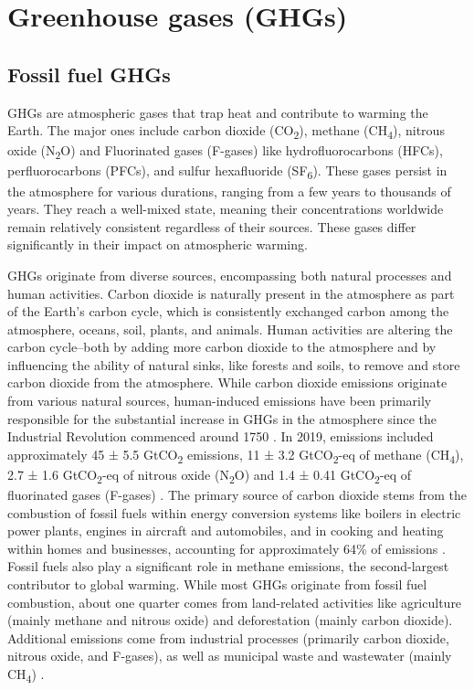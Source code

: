 \section{Greenhouse gases (GHGs)}
\subsection{Fossil fuel GHGs}

GHGs are atmospheric gases that trap heat and contribute to warming the Earth. The major ones include carbon dioxide (CO\textsubscript{2}), methane (CH\textsubscript{4}), nitrous oxide (N\textsubscript{2}O) and Fluorinated gases (F-gases) like hydrofluorocarbons (HFCs), perfluorocarbons (PFCs), and sulfur hexafluoride (SF\textsubscript{6}). These gases persist in the atmosphere for various durations, ranging from a few years to thousands of years. They reach a well-mixed state, meaning their concentrations worldwide remain relatively consistent regardless of their sources. 
These gases differ significantly in their impact on atmospheric warming. \par
GHGs originate from diverse sources, encompassing both natural processes and human activities. Carbon dioxide is naturally present in the atmosphere as part of the Earth's carbon cycle, which is consistently exchanged carbon among the atmosphere, oceans, soil, plants, and animals. Human activities are altering the carbon cycle–both by adding more carbon dioxide to the atmosphere and by influencing the ability of natural sinks, like forests and soils, to remove and store carbon dioxide from the atmosphere. While carbon dioxide emissions originate from various natural sources, human-induced emissions have been primarily responsible for the substantial increase in GHGs in the atmosphere since the Industrial Revolution commenced around 1750 \citep{RN3}. In 2019, emissions included approximately 45 ± 5.5 GtCO\textsubscript{2} emissions, 11 ± 3.2 GtCO\textsubscript{2}-eq of methane (CH\textsubscript{4}), 2.7 ± 1.6 GtCO\textsubscript{2}-eq of nitrous oxide (N\textsubscript{2}O) and 1.4 ± 0.41 GtCO\textsubscript{2}-eq of fluorinated gases (F-gases) \citep{ipcc2022}. The primary source of carbon dioxide stems from the combustion of fossil fuels within energy conversion systems like boilers in electric power plants, engines in aircraft and automobiles, and in cooking and heating within homes and businesses, accounting for approximately 64\% of emissions \citep{ipcc2022}. Fossil fuels also play a significant role in methane emissions, the second-largest contributor to global warming. While most GHGs originate from fossil fuel combustion, about one quarter comes from land-related activities like agriculture (mainly methane and nitrous oxide) and deforestation (mainly carbon dioxide). Additional emissions come from industrial processes (primarily carbon dioxide, nitrous oxide, and F-gases), as well as municipal waste and wastewater (mainly CH\textsubscript{4}) \citep{ipcc2022}. 
